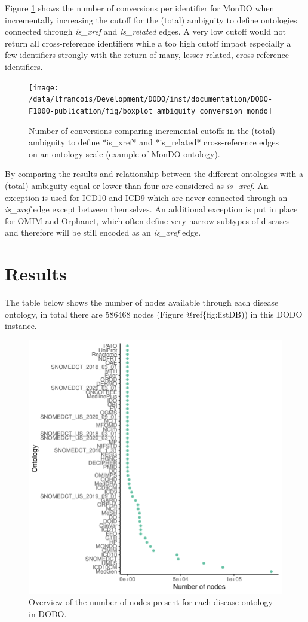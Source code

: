 \documentclass[9pt,a4paper,]{extarticle}
\begin{document}
Figure \ref{fig:boxplotAmbiguity} shows the number of conversions per identifier for MonDO when incrementally increasing the cutoff for the (total) ambiguity to define ontologies connected through \emph{is\_xref} and \emph{is\_related} edges. A very low cutoff would not return all cross-reference identifiers while a too high cutoff impact especially a few identifiers strongly with the return of many, lesser related, cross-reference identifiers.

\begin{figure}

{\centering \texttt{[image: /data/lfrancois/Development/DODO/inst/documentation/DODO-F1000-publication/fig/boxplot\_ambiguity\_conversion\_mondo]} 

}

\caption{Number of conversions comparing incremental cutoffs in the (total) ambiguity to define *is\_xref* and *is\_related* cross-reference edges on an ontology scale (example of MonDO ontology).}\label{fig:boxplotAmbiguity}
\end{figure}

By comparing the results and relationship between the different ontologies with a (total) ambiguity equal or lower than four are considered as \emph{is\_xref}. An exception is used for ICD10 and ICD9 which are never connected through an \emph{is\_xref} edge except between themselves. An additional exception is put in place for OMIM and Orphanet, which often define very narrow subtypes of diseases and therefore will be still encoded as an \emph{is\_xref} edge.

\hypertarget{results}{%
\section{Results}\label{results}}

The table below shows the number of nodes available through each disease ontology, in total there are 586468 nodes (Figure @ref\{fig:listDB)) in this DODO instance.

\begin{figure}

{\centering \includegraphics[width=0.5\linewidth,height=0.5\textheight]{DODO-F1000-publication_files/figure-latex/listDB-1} 

}

\caption{Overview of the number of nodes present for each disease ontology in DODO.}\label{fig:listDB}
\end{figure}
\end{document}
